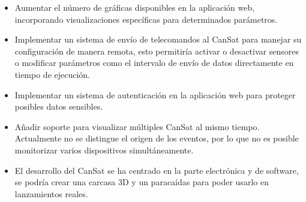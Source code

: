 \begin{itemize}
    \item Aumentar el número de gráficas disponibles en la aplicación web, incorporando visualizaciones específicas para determinados parámetros.
    \item Implementar un sistema de envío de telecomandos al CanSat para manejar su configuración de manera remota, esto permitiría activar o desactivar sensores o modificar parámetros como el intervalo de envío de datos directamente en tiempo de ejecución.
    \item Implementar un sistema de autenticación en la aplicación web para proteger posibles datos sensibles.
    \item Añadir soporte para visualizar múltiples CanSat al mismo tiempo. Actualmente no se distingue el origen de los eventos, por lo que no es posible monitorizar varios dispositivos simultáneamente.
    \item El desarrollo del CanSat se ha centrado en la parte electrónica y de software, se podría crear una carcasa 3D y un paracaídas para poder usarlo en lanzamientos reales.
\end{itemize}








